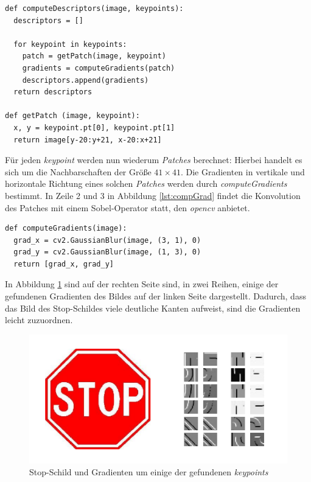 \lstset{language=Python}
\begin{lstlisting}
def computeDescriptors(image, keypoints):
  descriptors = []
  
  for keypoint in keypoints:
  	patch = getPatch(image, keypoint)
  	gradients = computeGradients(patch)
  	descriptors.append(gradients)
  return descriptors
  
def getPatch (image, keypoint):
  x, y = keypoint.pt[0], keypoint.pt[1]
  return image[y-20:y+21, x-20:x+21]
\end{lstlisting}

Für jeden \textit{keypoint} werden nun wiederum \textit{Patches} berechnet: Hierbei handelt es sich um die Nachbarschaften der Größe $41 \times 41$. Die Gradienten in vertikale und horizontale Richtung eines solchen \textit{Patches} werden durch \textit{computeGradients} bestimmt. In Zeile 2 und 3 in Abbildung \ref{lst:compGrad} findet die Konvolution des Patches mit einem Sobel-Operator statt, den \textit{opencv} anbietet.

\begin{lstlisting}
def computeGradients(image):
  grad_x = cv2.GaussianBlur(image, (3, 1), 0)
  grad_y = cv2.GaussianBlur(image, (1, 3), 0)
  return [grad_x, grad_y]
\end{lstlisting}

In Abbildung \ref{img:gradients} sind auf der rechten Seite sind, in zwei Reihen, einige der gefundenen Gradienten des Bildes auf der linken Seite dargestellt. Dadurch, dass das Bild des Stop-Schildes viele deutliche Kanten aufweist, sind die Gradienten leicht zuzuordnen.

\begin{figure}
	\centering
	\includegraphics[scale=0.65]{images/gradients_patch.png}
	\caption[stop]{Stop-Schild und Gradienten um einige der gefundenen \textit{keypoints} \footnotemark}
	\label{img:gradients}
\end{figure}

